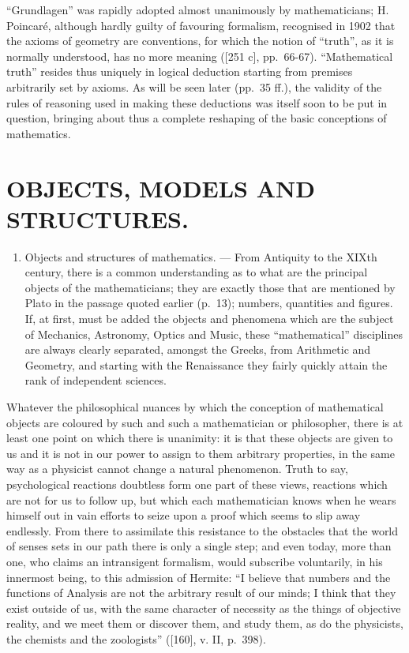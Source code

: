 ``Grundlagen'' was rapidly adopted almost unanimously by mathematicians; H. Poincaré, although hardly guilty of favouring formalism, recognised in 1902 that the axioms of geometry are conventions, for which the notion of ``truth'', as it is normally understood, has no more meaning ({[}251 c{]}, pp.~66-67). ``Mathematical truth'' resides thus uniquely in logical deduction starting from premises arbitrarily set by axioms. As will be seen later (pp.~35 ff.), the validity of the rules of reasoning used in making these deductions was itself soon to be put in question, bringing about thus a complete reshaping of the basic conceptions of mathematics.

\section*{OBJECTS, MODELS AND STRUCTURES.}
{}

\begin{enumerate}
\def\labelenumi{\Alph{enumi})}
\tightlist
\item
  Objects and structures of mathematics. --- From Antiquity to the XIXth century, there is a common understanding as to what are the principal objects of the mathematicians; they are exactly those that are mentioned by Plato in the passage quoted earlier (p.~13); numbers, quantities and figures. If, at first, must be added the objects and phenomena which are the subject of Mechanics, Astronomy, Optics and Music, these ``mathematical'' disciplines are always clearly separated, amongst the Greeks, from Arithmetic and Geometry, and starting with the Renaissance they fairly quickly attain the rank of independent sciences.
\end{enumerate}

Whatever the philosophical nuances by which the conception of mathematical objects are coloured by such and such a mathematician or philosopher, there is at least one point on which there is unanimity: it is that these objects are given to us and it is not in our power to assign to them arbitrary properties, in the same way as a physicist cannot change a natural phenomenon. Truth to say, psychological reactions doubtless form one part of these views, reactions which are not for us to follow up, but which each mathematician knows when he wears himself out in vain efforts to seize upon a proof which seems to slip away endlessly. From there to assimilate this resistance to the obstacles that the world of senses sets in our path there is only a single step; and even today, more than one, who claims an intransigent formalism, would subscribe voluntarily, in his innermost being, to this admission of Hermite: ``I believe that numbers and the functions of Analysis are not the arbitrary result of our minds; I think that they exist outside of us, with the same character of necessity as the things of objective reality, and we meet them or discover them, and study them, as do the physicists, the chemists and the zoologists'' ({[}160{]}, v. II, p.~398).

